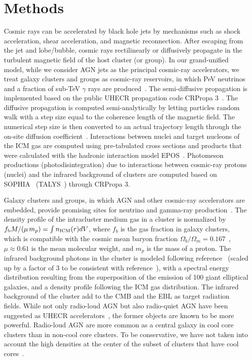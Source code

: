 \documentclass[aps,prd,onecolumn,superscriptaddress,11pt]{revtex4}
\begin{document}
\section*{Methods}
Cosmic rays can be accelerated by black hole jets by mechanisms such as shock acceleration, shear acceleration, and magnetic reconnection.  After escaping from the jet and lobe/bubble, cosmic rays rectilinearly or diffusively propagate in the turbulent magnetic field of the host cluster (or group). 
In our grand-unified model, while we consider AGN jets as the principal cosmic-ray accelerators, we treat galaxy clusters and groups as cosmic-ray reservoirs, in which PeV neutrinos and a fraction of sub-TeV $\gamma$ rays are produced~\cite{Murase:2008yt,Murase:2009zz,Kotera:2009ms}.
The semi-diffusive propagation is implemented based on the public UHECR propagation code CRPropa 3~\cite{2016JCAP...05..038A}. The diffusive propagation is computed semi-analytically by letting particles random walk with a step size equal to the coherence length of the magnetic field. The numerical step size is then converted to an actual trajectory length through the on-site diffusion coefficient~\cite{Kotera08a,FO16}. 
Interactions between nuclei and target nucleons of the ICM gas are computed using pre-tabulated cross sections and products that were calculated with the hadronic interaction model EPOS~\cite{PhysRevC.74.044902}. 
Photomeson productions (photodisintegration) due to interactions between cosmic-ray protons (nuclei) and the infrared background of clusters are computed based on SOPHIA~\cite{2000CoPhC.124..290M} (TALYS~\cite{TALYS}) through CRPropa 3. 

Galaxy clusters and groups, in which AGN and other cosmic-ray accelerators are embedded, provide promising sites for neutrino and gamma-ray production~\cite{Berezinsky:1996wx,Murase:2012rd}. The density profile of the intracluster medium gas in a cluster is normalized by $f_{\rm b}M/(\mu\,m_p)=\int n_{\rm ICM}(r)dV$, where $f_b$ is the gas fraction in galaxy clusters, which is compatible with the cosmic mean baryon fraction $\Omega_b/\Omega_m= 0.167$~\cite{2011ApJS..192...18K, 2013A&A...550A.131P}, $\mu\approx0.61$ is the mean molecular weight, and $m_p$ is the mass of a proton. The infrared background photons in the cluster is modeled following reference~\cite{Takami:2012gu} (scaled up by a factor of 3 to be consistent with reference~\cite{Kotera:2009ms}), with a spectral energy distribution resulting from the superposition of the emission of 100 giant elliptical galaxies, and a density profile following the ICM gas distribution. The infrared background of the cluster add to the CMB and the EBL as target radiation fields. 
While not only radio-loud AGN but also radio-quiet AGN have been suggested as UHECR accelerators~\cite{Peer:2009vnw}, the former objects are known to be more powerful. Radio-loud AGN are more common as a central galaxy in cool core clusters than in non-cool core clusters. To be conservative, we have not taken into account the high densities at the center of the subset of clusters that have cool cores~\cite{Kotera:2009ms}.  
\end{document}
